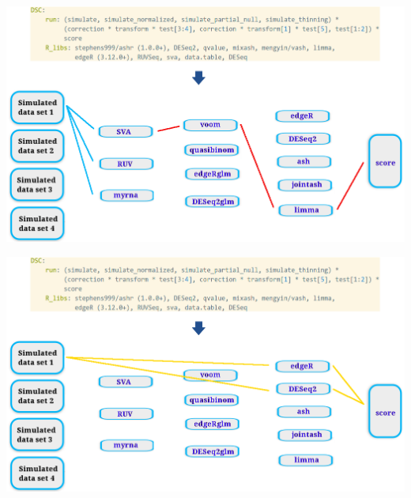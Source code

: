 \begin{withoutheadline}
\begin{frame}
  \centering \includegraphics[width=\textwidth]{figs/dsc4}
\end{frame}
\end{withoutheadline}
\begin{withoutheadline}
\begin{frame}
  \centering \includegraphics[width=\textwidth]{figs/dsc5}
\end{frame}
\end{withoutheadline}
